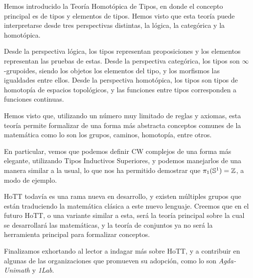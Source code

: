 \documentclass[../main.tex]{subfiles}
\begin{document}
Hemos introducido la Teor\'ia Homot\'opica de Tipos, en donde el concepto principal es de tipos y elementos de tipos.
Hemos visto que esta teor\'ia puede interpretarse desde tres perspectivas distintas, la l\'ogica, la categ\'orica y la homot\'opica.

Desde la perspectiva l\'ogica, los tipos representan proposiciones y los elementos representan las pruebas de estas.
Desde la perspectiva categ\'orica, los tipos son $\infty$-grupoides, siendo los objetos los elementos del tipo, y los morfismos las igualdades entre ellos.
Desde la perspectiva homot\'opica, los tipos son tipos de homotop\'ia de espacios topol\'ogicos, y las funciones entre tipos corresponden a funciones continuas.

Hemos visto que, utilizando un número muy limitado de reglas y axiomas, esta teor\'ia permite formalizar de una forma m\'as abstracta conceptos comunes de la matem\'atica como lo son los grupos, caminos, homotop\'ia, entre otros.

En particular, vemos que podemos definir CW complejos de una forma m\'as elegante, utilizando Tipos Inductivos Superiores, y podemos manejarlos de una manera similar a la usual, lo que nos ha permitido demostrar que $\pi_1(\mathbb{S}^1)=\mathbb{Z}$, a modo de ejemplo.

HoTT todav\'ia es una rama nueva en desarrollo, y existen m\'ultiples grupos que est\'an traduciendo la matem\'atica cl\'asica a este nuevo lenguaje.
Creemos que en el futuro HoTT, o una variante similar a esta, ser\'a la teor\'ia principal sobre la cual se desarrollar\'a las matem\'aticas, y la teor\'ia de conjuntos ya no ser\'a la herramienta principal para formalizar conceptos.

Finalizamos exhortando al lector a indagar m\'as sobre HoTT, y a contribuir en algunas de las organizaciones que promueven su adopci\'on, como lo son \textit{Agda-Unimath} y \textit{1Lab}.
\end{document}
